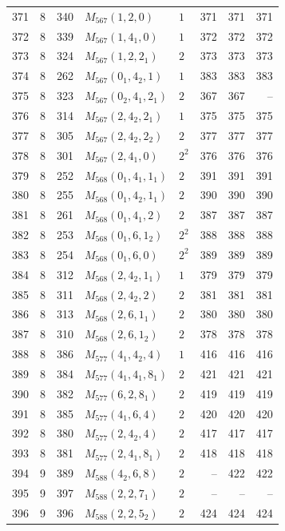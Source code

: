 \documentclass[11pt,a4paper]{article}
\begin{document}
\begin{longtable}{rrr|l|l|rrr}
371 & 8 & 340 & $M_{567}(1,2,0)$ & $1$ & 371 & 371 & 371\\
372 & 8 & 339 & $M_{567}(1,4_1,0)$ & $1$ & 372 & 372 & 372\\
373 & 8 & 324 & $M_{567}(1,2,2_1)$ & $2$ & 373 & 373 & 373\\
374 & 8 & 262 & $M_{567}(0_1,4_2,1)$ & $1$ & 383 & 383 & 383\\
375 & 8 & 323 & $M_{567}(0_2,4_1,2_1)$ & $2$ & 367 & 367 & --\\
376 & 8 & 314 & $M_{567}(2,4_2,2_1)$ & $1$ & 375 & 375 & 375\\
377 & 8 & 305 & $M_{567}(2,4_2,2_2)$ & $2$ & 377 & 377 & 377\\
378 & 8 & 301 & $M_{567}(2,4_1,0)$ & $2^2$ & 376 & 376 & 376\\
379 & 8 & 252 & $M_{568}(0_1,4_1,1_1)$ & $2$ & 391 & 391 & 391\\
380 & 8 & 255 & $M_{568}(0_1,4_2,1_1)$ & $2$ & 390 & 390 & 390\\
381 & 8 & 261 & $M_{568}(0_1,4_1,2)$ & $2$ & 387 & 387 & 387\\
382 & 8 & 253 & $M_{568}(0_1,6,1_2)$ & $2^2$ & 388 & 388 & 388\\
383 & 8 & 254 & $M_{568}(0_1,6,0)$ & $2^2$ & 389 & 389 & 389\\
384 & 8 & 312 & $M_{568}(2,4_2,1_1)$ & $1$ & 379 & 379 & 379\\
385 & 8 & 311 & $M_{568}(2,4_2,2)$ & $2$ & 381 & 381 & 381\\
386 & 8 & 313 & $M_{568}(2,6,1_1)$ & $2$ & 380 & 380 & 380\\
387 & 8 & 310 & $M_{568}(2,6,1_2)$ & $2$ & 378 & 378 & 378\\
388 & 8 & 386 & $M_{577}(4_1,4_2,4)$ & $1$ & 416 & 416 & 416\\
389 & 8 & 384 & $M_{577}(4_1,4_1,8_1)$ & $2$ & 421 & 421 & 421\\
390 & 8 & 382 & $M_{577}(6,2,8_1)$ & $2$ & 419 & 419 & 419\\
391 & 8 & 385 & $M_{577}(4_1,6,4)$ & $2$ & 420 & 420 & 420\\
392 & 8 & 380 & $M_{577}(2,4_2,4)$ & $2$ & 417 & 417 & 417\\
393 & 8 & 381 & $M_{577}(2,4_1,8_1)$ & $2$ & 418 & 418 & 418\\
394 & 9 & 389 & $M_{588}(4_2,6,8)$ & $2$ & -- & 422 & 422\\
395 & 9 & 397 & $M_{588}(2,2,7_1)$ & $2$ & -- & -- & --\\
396 & 9 & 396 & $M_{588}(2,2,5_2)$ & $2$ & 424 & 424 & 424\\

\end{longtable}
\end{document}
